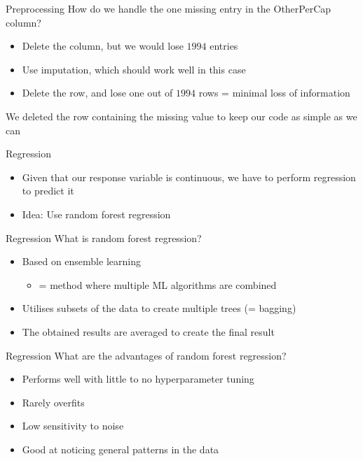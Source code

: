 \documentclass{beamer}
\begin{document}
	\begin{frame}{Preprocessing}
		How do we handle the one missing entry in the OtherPerCap column?
		\begin{itemize}
			\item Delete the column, but we would lose $1994$ entries
			\item Use imputation, which should work well in this case
			\item Delete the row, and lose one out of $1994$ rows = minimal loss of information
		\end{itemize}
		We deleted the row containing the missing value to keep our code as simple as we can
	\end{frame}
	\begin{frame}{Regression}
              \begin{itemize}
			\item Given that our response variable is continuous, we have to perform regression to predict it
			\item Idea: Use random forest regression
		\end{itemize}
        \end{frame}
	\begin{frame}{Regression}
		What is random forest regression?
		\begin{itemize}
			\item Based on ensemble learning
			\begin{itemize}
				\item = method where multiple ML algorithms are combined
			\end{itemize}
			\item Utilises subsets of the data to create multiple trees (= bagging)
			\item The obtained results are averaged to create the final result
		\end{itemize}
	\end{frame}
	\begin{frame}{Regression}
		What are the advantages of random forest regression?
		\begin{itemize}
			\item Performs well with little to no hyperparameter tuning
			\item Rarely overfits
			\item Low sensitivity to noise
			\item Good at noticing general patterns in the data
		\end{itemize}
	\end{frame}
\end{document}
